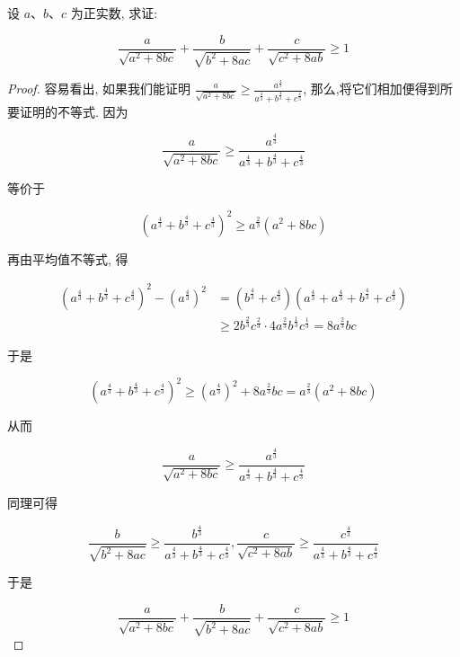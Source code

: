 \begin{example}
	设 $a 、 b 、 c$ 为正实数, 求证:
	
	$$
	\frac{a}{\sqrt{a^{2}+8 b c}}+\frac{b}{\sqrt{b^{2}+8 a c}}+\frac{c}{\sqrt{c^{2}+8 a b}} \geqslant 1
	$$
\end{example}
\begin{proof}
	容易看出, 如果我们能证明 $\frac{a}{\sqrt{a^{2}+8 b c}} \geqslant \frac{a^{\frac{4}{3}}}{a^{\frac{4}{3}}+b^{\frac{4}{3}}+c^{\frac{4}{3}}}$, 那么,将它们相加便得到所要证明的不等式. 因为
	
	$$
	\frac{a}{\sqrt{a^{2}+8 b c}} \geqslant \frac{a^{\frac{4}{3}}}{a^{\frac{4}{3}}+b^{\frac{4}{3}}+c^{\frac{4}{3}}}
	$$
	
	等价于
	
	$$
	\left(a^{\frac{4}{3}}+b^{\frac{4}{3}}+c^{\frac{4}{3}}\right)^{2} \geqslant a^{\frac{2}{3}}\left(a^{2}+8 b c\right)
	$$
	
	再由平均值不等式, 得
	
	$$
	\begin{aligned}
	\left(a^{\frac{4}{3}}+b^{\frac{4}{3}}+c^{\frac{4}{3}}\right)^{2}-\left(a^{\frac{4}{3}}\right)^{2} & =\left(b^{\frac{4}{3}}+c^{\frac{4}{3}}\right)\left(a^{\frac{4}{3}}+a^{\frac{4}{3}}+b^{\frac{4}{3}}+c^{\frac{4}{3}}\right) \\
	& \geqslant 2 b^{\frac{2}{3}} c^{\frac{2}{3}} \cdot 4 a^{\frac{2}{3}} b^{\frac{1}{3}} c^{\frac{1}{3}}=8 a^{\frac{2}{3}} b c
	\end{aligned}
	$$
	
	于是
	
	$$
	\left(a^{\frac{4}{3}}+b^{\frac{4}{3}}+c^{\frac{4}{3}}\right)^{2} \geqslant\left(a^{\frac{4}{3}}\right)^{2}+8 a^{\frac{2}{3}} b c=a^{\frac{2}{3}}\left(a^{2}+8 b c\right)
	$$
	
	从而
	
	$$
	\frac{a}{\sqrt{a^{2}+8 b c}} \geqslant \frac{a^{\frac{4}{3}}}{a^{\frac{4}{3}}+b^{\frac{4}{3}}+c^{\frac{4}{3}}}
	$$
	
	同理可得
	
	$$
	\frac{b}{\sqrt{b^{2}+8 a c}} \geqslant \frac{b^{\frac{4}{3}}}{a^{\frac{4}{3}}+b^{\frac{4}{3}}+c^{\frac{4}{3}}}, \frac{c}{\sqrt{c^{2}+8 a b}} \geqslant \frac{c^{\frac{4}{3}}}{a^{\frac{4}{3}}+b^{\frac{4}{3}}+c^{\frac{4}{3}}}
	$$
	
	于是
	
	$$
	\frac{a}{\sqrt{a^{2}+8 b c}}+\frac{b}{\sqrt{b^{2}+8 a c}}+\frac{c}{\sqrt{c^{2}+8 a b}} \geqslant 1
	$$
\end{proof}
